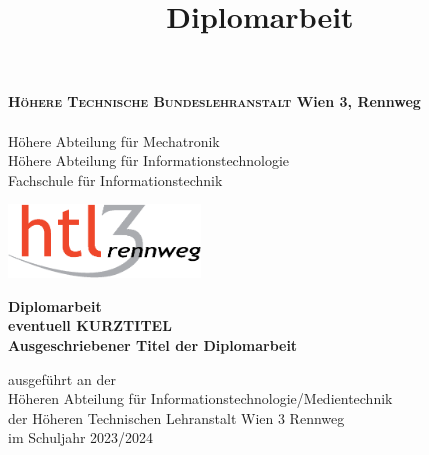 \documentclass[
    headings=optiontotocandhead,%
    twoside,
    numbers=noenddot,%
    toc=flat, %
    12pt, %
    titlepage, %
    parskip=full, %
    listof=totoc, %
    listof=flat, %
    numbers=noenddot, %
    bibliography=totoc, %
    a4paper,DIV=14,
    BCOR=15mm,
]{scrbook}
\begin{document}
\newcommand{\kapitelautor}{}




\frontmatter %
\title{Diplomarbeit}

\begin{titlepage}
\begin{minipage}[b]{1\columnwidth}
\parbox[b]{99mm}{
\begin{TitlePageBox}
\footnotesize%
\textsf{%
\textbf{\textsc{Höhere Technische Bundeslehranstalt} Wien 3, Rennweg}\\
\\
Höhere Abteilung für Mechatronik\\
Höhere Abteilung für Informationstechnologie\\
Fachschule für Informationstechnik}
\end{TitlePageBox}
}\hfill\parbox[b]{50mm}{\includegraphics[width=51mm]{HTL3RLogoRGB}}
\mbox{}
\end{minipage}

\vspace{1cm}


\begin{center}

\textbf{\LARGE{}Diplomarbeit}{\large{}}\\ %
{\large{}\vspace{15mm}
 }\textbf{\large{}eventuell KURZTITEL}\\
\textbf{\large{}Ausgeschriebener Titel der Diplomarbeit}\\

 \vfill

 ausgeführt an der\\
 Höheren Abteilung für Informationstechnologie/Medientechnik\\
 der Höheren Technischen Lehranstalt Wien 3 Rennweg\\

 \vfill
 im Schuljahr 2023/2024\\


\end{center}
\end{titlepage}
\end{document}
